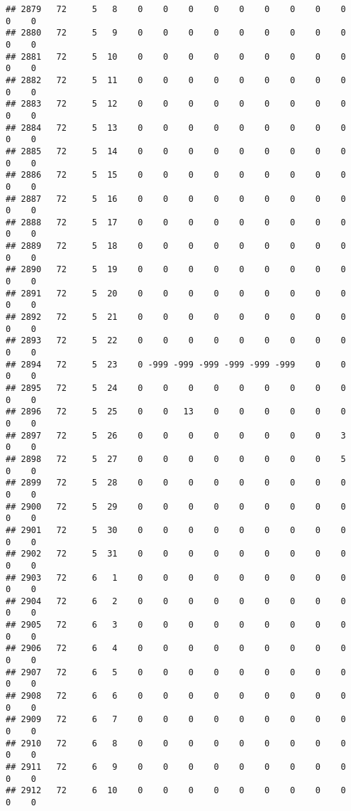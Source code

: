 \documentclass[]{article}
\begin{document}
\begin{verbatim}
## 2879   72     5   8    0    0    0    0    0    0    0    0    0    0    0
## 2880   72     5   9    0    0    0    0    0    0    0    0    0    0    0
## 2881   72     5  10    0    0    0    0    0    0    0    0    0    0    0
## 2882   72     5  11    0    0    0    0    0    0    0    0    0    0    0
## 2883   72     5  12    0    0    0    0    0    0    0    0    0    0    0
## 2884   72     5  13    0    0    0    0    0    0    0    0    0    0    0
## 2885   72     5  14    0    0    0    0    0    0    0    0    0    0    0
## 2886   72     5  15    0    0    0    0    0    0    0    0    0    0    0
## 2887   72     5  16    0    0    0    0    0    0    0    0    0    0    0
## 2888   72     5  17    0    0    0    0    0    0    0    0    0    0    0
## 2889   72     5  18    0    0    0    0    0    0    0    0    0    0    0
## 2890   72     5  19    0    0    0    0    0    0    0    0    0    0    0
## 2891   72     5  20    0    0    0    0    0    0    0    0    0    0    0
## 2892   72     5  21    0    0    0    0    0    0    0    0    0    0    0
## 2893   72     5  22    0    0    0    0    0    0    0    0    0    0    0
## 2894   72     5  23    0 -999 -999 -999 -999 -999 -999    0    0    0    0
## 2895   72     5  24    0    0    0    0    0    0    0    0    0    0    0
## 2896   72     5  25    0    0   13    0    0    0    0    0    0    0    0
## 2897   72     5  26    0    0    0    0    0    0    0    0    3    0    0
## 2898   72     5  27    0    0    0    0    0    0    0    0    5    0    0
## 2899   72     5  28    0    0    0    0    0    0    0    0    0    0    0
## 2900   72     5  29    0    0    0    0    0    0    0    0    0    0    0
## 2901   72     5  30    0    0    0    0    0    0    0    0    0    0    0
## 2902   72     5  31    0    0    0    0    0    0    0    0    0    0    0
## 2903   72     6   1    0    0    0    0    0    0    0    0    0    0    0
## 2904   72     6   2    0    0    0    0    0    0    0    0    0    0    0
## 2905   72     6   3    0    0    0    0    0    0    0    0    0    0    0
## 2906   72     6   4    0    0    0    0    0    0    0    0    0    0    0
## 2907   72     6   5    0    0    0    0    0    0    0    0    0    0    0
## 2908   72     6   6    0    0    0    0    0    0    0    0    0    0    0
## 2909   72     6   7    0    0    0    0    0    0    0    0    0    0    0
## 2910   72     6   8    0    0    0    0    0    0    0    0    0    0    0
## 2911   72     6   9    0    0    0    0    0    0    0    0    0    0    0
## 2912   72     6  10    0    0    0    0    0    0    0    0    0    0    0

\end{verbatim}
\end{document}
